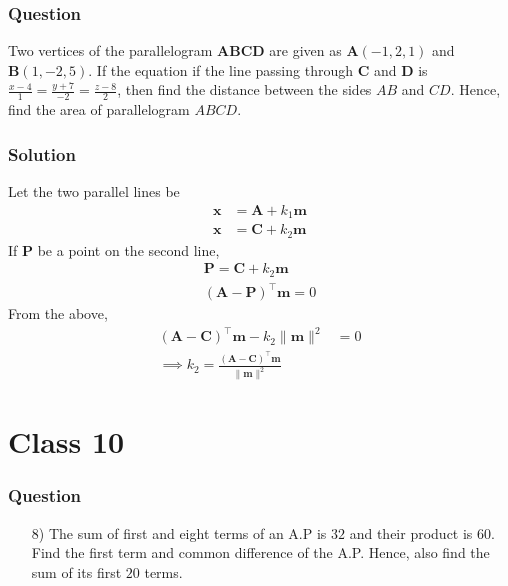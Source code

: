 \documentclass{beamer}
\providecommand{\brak}[1]{\ensuremath{\left(#1\right)}}
\theoremstyle{remark}
\providecommand{\norm}[1]{\lVert#1\rVert}
\let\vec\mathbf
\begin{document}
\begin{frame}
\frametitle{Question }
Two vertices of the parallelogram $\vec{ABCD}$ are given as $\vec{A}\brak{-1,2,1}$ and $\vec{B}\brak{1,-2,5}$. If the equation if the line passing through $\vec{C}$ and $\vec{D}$ is $\frac{x-4}{1} = \frac{y+7}{-2} = \frac{z-8}{2}$, then find the distance between the sides ${AB}$ and ${CD}$. Hence, find the area of parallelogram ${ABCD}$.
\end{frame}
%
\begin{frame}
\frametitle{Solution}
Let  the two parallel lines be
\begin{align}
    \vec{x} & = \vec{A} + k_1\vec{m}  \\
    \vec{x} &=  \vec{C} + k_2\vec{m} 
\end{align}
If $\vec{P}$ be a point on the second line, 
\begin{align}
    \vec{P} =  \vec{C} + k_2\vec{m} 
    \\
	\brak{\vec{A}-\vec{P}}^{\top}\vec{m} = 0
\end{align}
From the above, 
\begin{align}
	\brak{\vec{A}-\vec{C}}^{\top}\vec{m} -k_2\norm{\vec{m}}^2&= 0
	\\
	\implies k_2 = \frac{
		\brak{\vec{A}-\vec{C}}^{\top}\vec{m}}{ \norm{\vec{m}}^2}
\end{align}
    
\end{frame}








    \section{Class 10}






\begin{frame}
\frametitle{Question }
\begin{enumerate}
    \item [8)]
The sum of first and eight terms of an A.P is $32$ and their product is $60$. Find the first term and common difference of the A.P. Hence, also find the sum of its first $20$ terms. 
\end{enumerate}
\end{frame}
\end{document}
